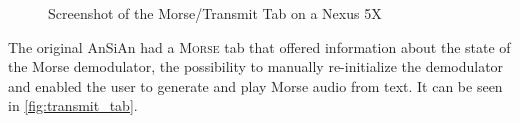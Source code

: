 \begin{figure}
\centering
{}
\hfill\null
{}
\caption{Screenshot of the Morse/Transmit Tab on a Nexus 5X}
\label{fig:transmit_tab}
\end{figure}

The original \ac{AnSiAn} had a \textsc{Morse} tab that offered information about the state of the Morse demodulator, the possibility to manually re-initialize the demodulator and enabled the user to generate and play Morse audio from text. It can be seen in \autoref{fig:transmit_tab}.

